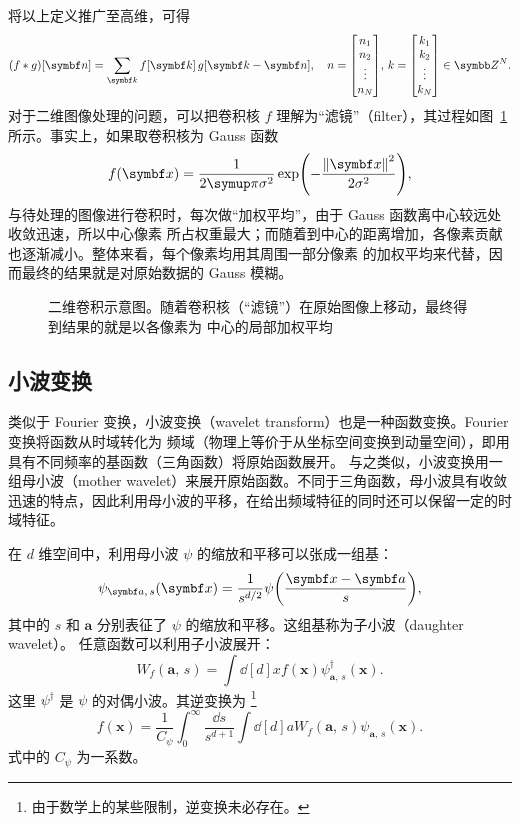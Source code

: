 将以上定义推广至高维，可得
\begin{equation}
  (f \ast g) [\bm{n}] = \sum_{\bm{k}} f[\bm{k}] \, g[\bm{k}-\bm{n}] \qc
  n=\mqty[n_1 \\ n_2 \\ \vdots \\ n_N], \, k=\mqty[k_1 \\ k_2 \\ \vdots \\ k_N] \in \Z^N.
\end{equation}
对于二维图像处理的问题，可以把卷积核 $f$ 理解为“滤镜”（filter），其过程如图~\ref{fig:convolution}
所示。事实上，如果取卷积核为 Gauss 函数
\begin{equation}
  f(\bm{x}) = \frac{1}{2\pp\sigma^2} \exp(-\frac{\norm{\bm{x}}^2}{2\sigma^2}),
\end{equation}
与待处理的图像进行卷积时，每次做“加权平均”，由于 Gauss 函数离中心较远处收敛迅速，所以中心像素
所占权重最大；而随着到中心的距离增加，各像素贡献也逐渐减小。整体来看，每个像素均用其周围一部分像素
的加权平均来代替，因而最终的结果就是对原始数据的 Gauss 模糊。

\begin{figure}[htb]
  \centering
  \caption{二维卷积示意图。随着卷积核（“滤镜”）在原始图像上移动，最终得到结果的就是以各像素为
    中心的局部加权平均}
  \label{fig:convolution}
\end{figure}

\subsection{小波变换}

类似于 Fourier 变换，小波变换（wavelet transform）也是一种函数变换。Fourier 变换将函数从时域转化为
频域（物理上等价于从坐标空间变换到动量空间），即用具有不同频率的基函数（三角函数）将原始函数展开。
与之类似，小波变换用一组母小波（mother wavelet）来展开原始函数。不同于三角函数，母小波具有收敛
迅速的特点，因此利用母小波的平移，在给出频域特征的同时还可以保留一定的时域特征。

在 $d$ 维空间中，利用母小波 $\psi$ 的缩放和平移可以张成一组基：
\begin{equation}
  \label{eq:daughter-wavelet}
  \psi_{\bm{a},\,s}(\bm{x}) = \frac{1}{s^{d/2}} \psi\qty(\frac{\bm{x}-\bm{a}}{s}),
\end{equation}
其中的 $s$ 和 $\bm{a}$ 分别表征了 $\psi$ 的缩放和平移。这组基称为子小波（daughter wavelet）。
任意函数可以利用子小波展开：
\begin{equation}
  W_f(\bm{a},\,s) = \int \dd[d]{x} f(\bm{x}) \psi^\dagger_{\bm{a},\,s}(\bm{x}).
\end{equation}
这里 $\psi^\dagger$ 是 $\psi$ 的对偶小波。其逆变换为
\footnote{由于数学上的某些限制，逆变换未必存在。}
\begin{equation}
  f(\bm{x}) = \frac{1}{C_\psi} \int_0^\infty \frac{\dd{s}}{s^{d+1}}
              \int \dd[d]{a} W_f(\bm{a},\,s) \psi_{\bm{a},\,s}(\bm{x}).
\end{equation}
式中的 $C_\psi$ 为一系数。

